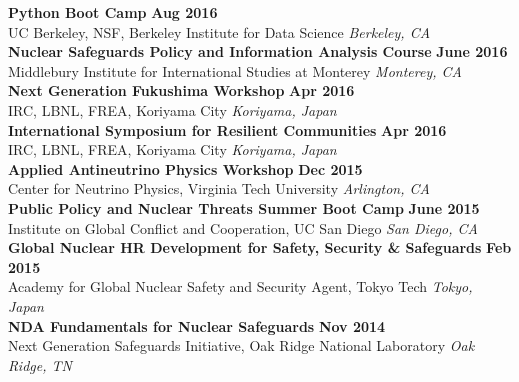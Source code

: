 \documentclass[margin, 10pt]{style/res} %
\begin{document}
\begin{resume}
{\bf Python Boot Camp} \hfill {\bf Aug 2016}\\
{\small{UC Berkeley, NSF, Berkeley Institute for Data Science}} \hfill {\sl Berkeley, CA}\\[-3.5ex]

\newpage
{\bf Nuclear Safeguards Policy and Information Analysis Course} \hfill {\bf June 2016}\\
{\small{Middlebury Institute for International Studies at Monterey}} \hfill {\sl Monterey, CA}\\[-3.5ex]

{\bf Next Generation Fukushima Workshop} \hfill {\bf Apr 2016}\\
{\small{IRC, LBNL, FREA, Koriyama City}} \hfill {\sl Koriyama, Japan}\\[-3.5ex]

{\bf International Symposium for Resilient Communities} \hfill {\bf Apr 2016}\\
{\small{IRC, LBNL, FREA, Koriyama City}} \hfill {\sl Koriyama, Japan}\\[-3.5ex]

{\bf Applied Antineutrino Physics Workshop} \hfill {\bf Dec 2015}\\
{\small{Center for Neutrino Physics, Virginia Tech University}} \hfill {\sl Arlington, CA}\\[-3.5ex]

{\bf Public Policy and Nuclear Threats Summer Boot Camp} \hfill {\bf June 2015}\\
{\small{Institute on Global Conflict and Cooperation, UC San Diego}} \hfill {\sl San Diego, CA}\\[-3.5ex]

{\bf Global Nuclear HR Development for Safety, Security \& Safeguards} \hfill {\bf Feb 2015}\\
{\small{Academy for Global Nuclear Safety and Security Agent, Tokyo Tech}}  \hfill {\sl Tokyo, Japan}\\[-3.5ex]

{\bf NDA Fundamentals for Nuclear Safeguards}   \hfill {\bf Nov 2014}\\
{\small{Next Generation Safeguards Initiative, Oak Ridge National Laboratory}} \hfill  {\sl Oak Ridge, TN}





\end{resume}
\end{document}
